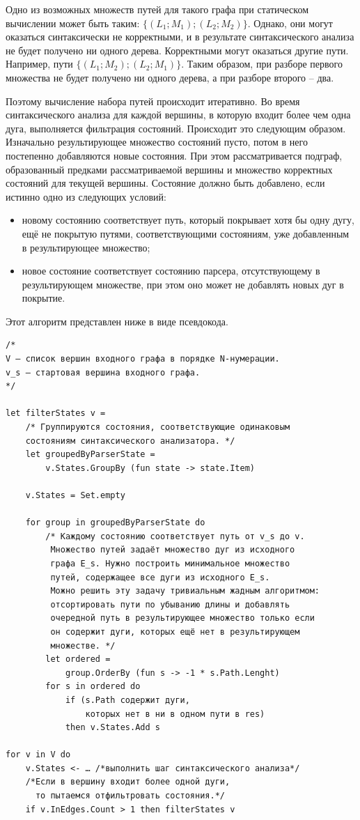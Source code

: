 \documentclass[a5paper]{article}
\begin{document}
Одно из возможных множеств путей для такого графа при статическом вычислении может быть таким: $\{(L_1; M_1); (L_2; M_2)\}$. Однако, они могут оказаться синтаксически не корректными, и в результате синтаксического анализа не будет получено ни одного дерева. Корректными могут оказаться другие пути. Например, пути $\{(L_1; M_2); (L_2; M_1)\}$. Таким образом, при разборе первого множества не будет получено ни одного дерева, а при разборе второго -- два.

Поэтому вычисление набора путей происходит итеративно. Во время синтаксического анализа для каждой вершины, в которую входит более чем одна дуга, выполняется фильтрация состояний. Происходит это следующим образом. Изначально результирующее множество состояний пусто, потом в него постепенно добавляются новые состояния. При этом рассматривается подграф, образованный предками рассматриваемой вершины и множество корректных состояний для текущей вершины. Состояние должно быть добавлено, если истинно одно из следующих условий: 
\begin{itemize}
    \item новому состоянию соответствует путь, который покрывает хотя бы одну дугу, ещё не покрытую путями, соответствующими состояниям, уже добавленным в результирующее множество;
    \item новое состояние соответствует состоянию парсера, отсутствующему в результирующем множестве, при этом оно может не добавлять новых дуг в покрытие.
\end{itemize}

Этот алгоритм представлен ниже в виде псевдокода. 
\begin{verbatim}
/*
V – список вершин входного графа в порядке N-нумерации.
v_s – стартовая вершина входного графа.
*/

let filterStates v =
    /* Группируются состояния, соответствующие одинаковым 
    состояниям синтаксического анализатора. */
    let groupedByParserState =
        v.States.GroupBy (fun state -> state.Item)

    v.States = Set.empty

    for group in groupedByParserState do
        /* Каждому состоянию соответствует путь от v_s до v.
         Множество путей задаёт множество дуг из исходного 
         графа E_s. Нужно построить минимальное множество 
         путей, содержащее все дуги из исходного E_s.
         Можно решить эту задачу тривиальным жадным алгоритмом:
         отсортировать пути по убыванию длины и добавлять 
         очередной путь в результирующее множество только если
         он содержит дуги, которых ещё нет в результирующем 
         множестве. */
        let ordered = 
            group.OrderBy (fun s -> -1 * s.Path.Lenght)
        for s in ordered do
            if (s.Path содержит дуги, 
                которых нет в ни в одном пути в res) 
            then v.States.Add s

for v in V do
    v.States <- … /*выполнить шаг синтаксического анализа*/
    /*Если в вершину входит более одной дуги,
      то пытаемся отфильтровать состояния.*/
    if v.InEdges.Count > 1 then filterStates v

\end{verbatim}
\end{document}
